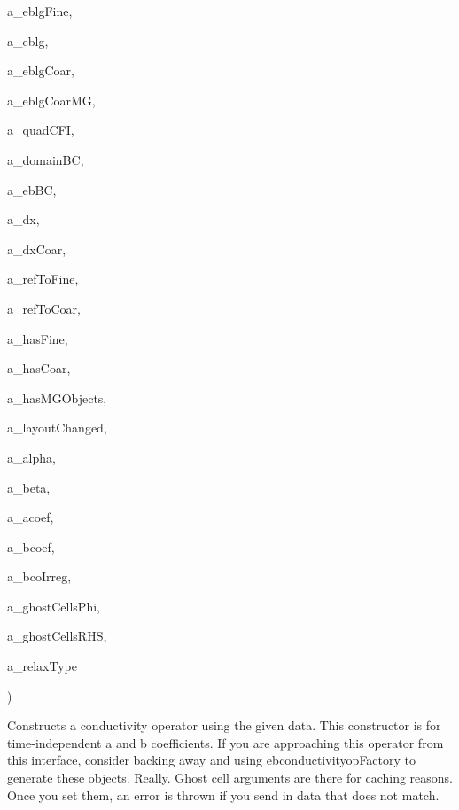 {\begin{DoxyParamCaption}
\item[{const E\+B\+Level\+Grid \&}]{a\+\_\+eblg\+Fine, }
\item[{const E\+B\+Level\+Grid \&}]{a\+\_\+eblg, }
\item[{const E\+B\+Level\+Grid \&}]{a\+\_\+eblg\+Coar, }
\item[{const E\+B\+Level\+Grid \&}]{a\+\_\+eblg\+Coar\+MG, }
\item[{const Ref\+Counted\+Ptr$<$ E\+B\+Quad\+C\+F\+Interp $>$ \&}]{a\+\_\+quad\+C\+FI, }
\item[{const Ref\+Counted\+Ptr$<$ Conductivity\+Base\+Domain\+BC $>$ \&}]{a\+\_\+domain\+BC, }
\item[{const Ref\+Counted\+Ptr$<$ Conductivity\+Base\+E\+B\+BC $>$ \&}]{a\+\_\+eb\+BC, }
\item[{const Real \&}]{a\+\_\+dx, }
\item[{const Real \&}]{a\+\_\+dx\+Coar, }
\item[{const int \&}]{a\+\_\+ref\+To\+Fine, }
\item[{const int \&}]{a\+\_\+ref\+To\+Coar, }
\item[{const bool \&}]{a\+\_\+has\+Fine, }
\item[{const bool \&}]{a\+\_\+has\+Coar, }
\item[{const bool \&}]{a\+\_\+has\+M\+G\+Objects, }
\item[{const bool \&}]{a\+\_\+layout\+Changed, }
\item[{const Real \&}]{a\+\_\+alpha, }
\item[{const Real \&}]{a\+\_\+beta, }
\item[{const Ref\+Counted\+Ptr$<$ Level\+Data$<$ E\+B\+Cell\+F\+AB $>$ $>$ \&}]{a\+\_\+acoef, }
\item[{const Ref\+Counted\+Ptr$<$ Level\+Data$<$ E\+B\+Flux\+F\+AB $>$ $>$ \&}]{a\+\_\+bcoef, }
\item[{const Ref\+Counted\+Ptr$<$ Level\+Data$<$ Base\+I\+V\+F\+AB$<$ Real $>$ $>$ $>$ \&}]{a\+\_\+bco\+Irreg, }
\item[{const Int\+Vect \&}]{a\+\_\+ghost\+Cells\+Phi, }
\item[{const Int\+Vect \&}]{a\+\_\+ghost\+Cells\+R\+HS, }
\item[{const int \&}]{a\+\_\+relax\+Type}
\end{DoxyParamCaption}
)}\hypertarget{classebconductivityop_a50a0d77b64d8a917c4fd860137751110}{}\label{classebconductivityop_a50a0d77b64d8a917c4fd860137751110}
Constructs a conductivity operator using the given data. This constructor is for time-\/independent a and b coefficients. If you are approaching this operator from this interface, consider backing away and using ebconductivityop\+Factory to generate these objects. Really. Ghost cell arguments are there for caching reasons. Once you set them, an error is thrown if you send in data that does not match. 
